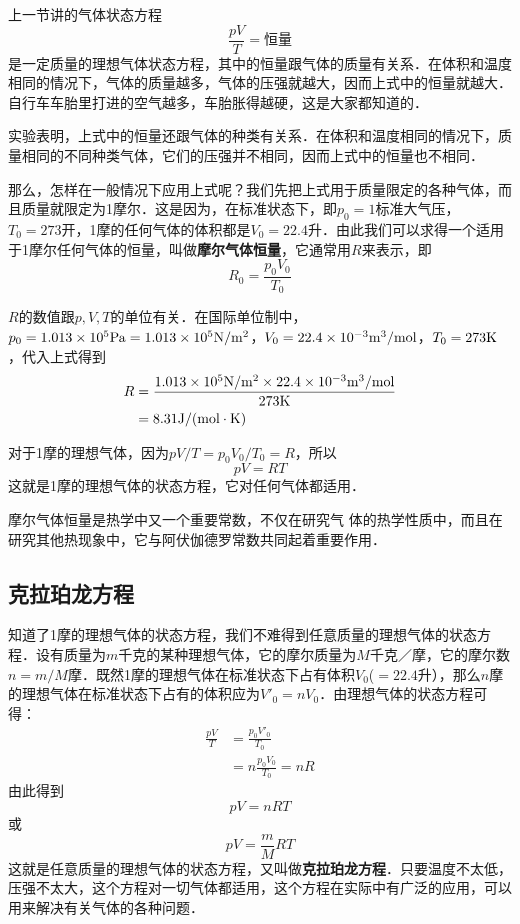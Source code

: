 上一节讲的气体状态方程
\[\frac{pV}{T}=\text{恒量} \]
是一定质量的理想气体状态方程，其中的恒量跟气体的质量有关系．在体积和温度相同的情况下，气体的质量越多，气体的压强就越大，因而上式中的恒量就越大．自行车车胎里打进的空气越多，车胎胀得越硬，这是大家都知道的．

实验表明，上式中的恒量还跟气体的种类有关系．在体积和温度相同的情况下，质量相同的不同种类气体，它们的压强并不相同，因而上式中的恒量也不相同．

那么，怎样在一般情况下应用上式呢？我们先把上式用于质量限定的各种气体，而且质量就限定为1摩尔．这是因为，在标准状态下，即$p_0=1$标准大气压，$T_0=273$开，1摩的任何气体的体积都是$V_0=22.4$升．由此我们可以求得一个适用于1摩尔任何气体的恒量，叫做\textbf{摩尔气体恒量}，它通常用$R$来表示，即
\[R_0=\frac{p_0V_0}{T_0} \]

$R$的数值跟$p,V,T$的单位有关．在国际单位制中，$p_0=
1.013\times 10^5{\rm Pa}=1.013\times 10^5{\rm N}/{\rm m^2}$，$V_0=22. 4\times 10^{-3}{\rm m^3}/{\rm mol}$，$T_0=273{\rm K}$，代入上式得到
\[\begin{split}
R&=\frac{1.013\times 10^5{\rm N}/{\rm m^2}\times  22. 4\times 10^{-3}{\rm m^3}/{\rm mol}}{273{\rm K} }\\
&=8.31{\rm J}/({\rm mol\cdot K})
\end{split} \]

对于1摩的理想气体，因为$pV/T=p_0V_0/T_0=R$，所以
$$pV=RT$$
这就是1摩的理想气体的状态方程，它对任何气体都适用．

摩尔气体恒量是热学中又一个重要常数，不仅在研究气
体的热学性质中，而且在研究其他热现象中，它与阿伏伽德罗常数共同起着重要作用．

\subsection{克拉珀龙方程} 

知道了1摩的理想气体的状态方程，我们不难得到任意质量的理想气体的状态方程．设有质量为$m$千克的某种理想气体，它的摩尔质量为$M$千克／摩，它的摩尔数$n=m/M$摩．既然1摩的理想气体在标准状态下占有体积$V_0$($=22.4$升），那么$n$摩的理想气体在标准状态下占有的体积应为$V'_0=nV_0$．由理想气体的状态方程可得：
\[\begin{split}
\frac{pV}{T}&=\frac{p_0V'_0}{T_0}\\
&=n\frac{p_0V_0}{T_0}=nR
\end{split} \]
由此得到
\[pV=nRT \]
或\[pV=\frac{m}{M}RT \]
这就是任意质量的理想气体的状态方程，又叫做\textbf{克拉珀龙方程}．只要温度不太低，压强不太大，这个方程对一切气体都适用，这个方程在实际中有广泛的应用，可以用来解决有关气体的各种问题．

